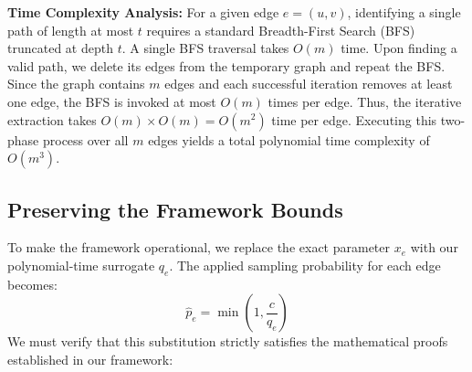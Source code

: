 \documentclass[11pt,a4paper]{article}
\begin{document}
\textbf{Time Complexity Analysis:} 
For a given edge $e=(u,v)$, identifying a single path of length at most $t$ requires a standard Breadth-First Search (BFS) truncated at depth $t$. A single BFS traversal takes $O(m)$ time. Upon finding a valid path, we delete its edges from the temporary graph and repeat the BFS. Since the graph contains $m$ edges and each successful iteration removes at least one edge, the BFS is invoked at most $O(m)$ times per edge. Thus, the iterative extraction takes $O(m) \times O(m) = O(m^2)$ time per edge. Executing this two-phase process over all $m$ edges yields a total polynomial time complexity of $O(m^3)$.

\subsection{Preserving the Framework Bounds}
To make the framework operational, we replace the exact parameter $x_e$ with our polynomial-time surrogate $q_e$. The applied sampling probability for each edge becomes:
\[
\hat{p}_e = \min\left(1, \frac{c}{q_e}\right)
\]
We must verify that this substitution strictly satisfies the mathematical proofs established in our framework:
\end{document}
